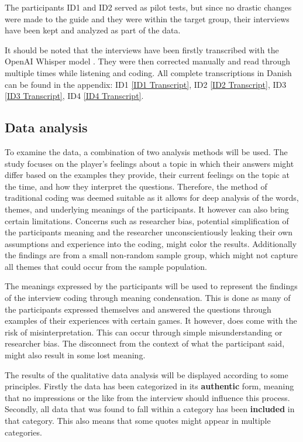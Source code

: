The participants ID1 and ID2 served as pilot tests, but since no drastic changes were made to the guide and they were within the target group, their interviews have been kept and analyzed as part of the data.

It should be noted that the interviews have been firstly transcribed with the OpenAI Whisper model \cite{noauthor_openai_nodate}. They were then corrected manually and read through multiple times while listening and coding. All complete transcriptions in Danish can be found in the appendix: ID1  \ref{ID1 Transcript}, ID2 \ref{ID2 Transcript}, ID3 \ref{ID3 Transcript}, ID4 \ref{ID4 Transcript}.

\subsection{Data analysis}
To examine the data, a combination of two analysis methods will be used. The study focuses on the player's feelings about a topic in which their answers might differ based on the examples they provide, their current feelings on the topic at the time, and how they interpret the questions. Therefore, the method of traditional coding was deemed suitable as it allows for deep analysis of the words, themes, and underlying meanings of the participants. It however can also bring certain limitations. Concerns such as researcher bias, potential simplification of the participants meaning and the researcher unconscientiously leaking their own assumptions and experience into the coding, might color the results. Additionally the findings are from a small non-random sample group, which might not capture all themes that could occur from the sample population.

The meanings expressed by the participants will be used to represent the findings of the interview coding through meaning condensation. This is done as many of the participants expressed themselves and answered the questions through examples of their experiences with certain games. It however, does come with the risk of misinterpretation. This can occur through simple misunderstanding or researcher bias. The disconnect from the context of what the participant said, might also result in some lost meaning. 

The results of the qualitative data analysis will be displayed according to some principles. Firstly the data has been categorized in its \textbf{authentic} form, meaning that no impressions or the like from the interview should influence this process. Secondly, all data that was found to fall within a category has been \textbf{included} in that category. This also means that some quotes might appear in multiple categories. 

